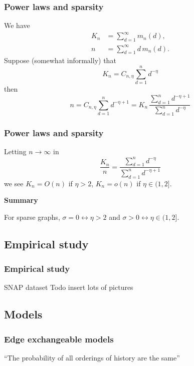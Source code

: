 \documentclass[final,hyperref={pdfpagelabels=false},noamsthm]{beamer}
\begin{document}
\begin{frame}
	\frametitle{Power laws and sparsity}
	We have
	\begin{align}
		K_n &= \sum_{d=1}^\infty m_n(d), \\
		n &= \sum_{d=1}^\infty d\, m_n(d).
	\end{align}
	Suppose (somewhat informally) that
	\begin{equation}
		K_n = C_{n, \eta} \sum_{d=1}^n d^{-\eta}
	\end{equation}
	\pause
	then 
	\begin{equation}	
	n = C_{n, \eta} \sum_{d=1}^n d^{-\eta + 1} = K_n \, \frac{\sum_{d=1}^n d^{-\eta + 1}}{\sum_{d=1}^n d^{-\eta}}
	\end{equation}
\end{frame}

\begin{frame}
	\frametitle{Power laws and sparsity}
	Letting $n\to \infty$ in
	\begin{equation}
		\frac{K_n}{n} = \frac{\sum_{d=1}^n d^{-\eta}}{\sum_{d=1}^n d^{-\eta + 1}}
	\end{equation}
	we see $K_n = O(n)$ if $\eta > 2$, $K_n = o(n)$ if $\eta \in (1, 2]$.
	\vspace{40pt}
	\pause
	
	\textbf{Summary}
	
	For sparse graphs, $\sigma=0 \leftrightarrow \eta > 2$ and $\sigma > 0 \leftrightarrow \eta \in (1,2]$.
\end{frame}

\subsection{Empirical study}
\begin{frame}
	\frametitle{Empirical study}
	SNAP dataset
	Todo insert lots of pictures
	
\end{frame}

\subsection{Models}
\begin{frame}
	\frametitle{Edge exchangeable models}
	``The probability of all orderings of history are the same''
	
\end{frame}
\end{document}
